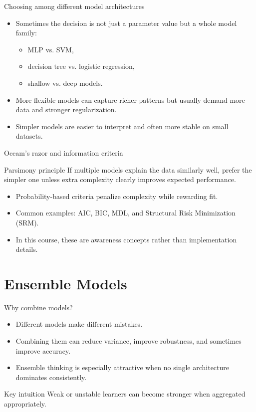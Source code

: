 \documentclass[12pt]{beamer}
\begin{document}
\begin{frame}{Choosing among different model architectures}
  \begin{itemize}
    \item Sometimes the decision is not just a parameter value but a whole model family:
      \begin{itemize}
        \item MLP vs. SVM,
        \item decision tree vs. logistic regression,
        \item shallow vs. deep models.
      \end{itemize}
    \item More flexible models can capture richer patterns but usually demand more data and stronger regularization.
    \item Simpler models are easier to interpret and often more stable on small datasets.
  \end{itemize}
\end{frame}

\begin{frame}{Occam's razor and information criteria}
  \begin{conceptbox}{Parsimony principle}
    If multiple models explain the data similarly well, prefer the simpler one unless extra complexity
    clearly improves expected performance.
  \end{conceptbox}
  \begin{itemize}
    \item Probability-based criteria penalize complexity while rewarding fit.
    \item Common examples: AIC, BIC, MDL, and Structural Risk Minimization (SRM).
    \item In this course, these are awareness concepts rather than implementation details.
  \end{itemize}
\end{frame}

\section{Ensemble Models}

\begin{frame}{Why combine models?}
  \begin{itemize}
    \item Different models make different mistakes.
    \item Combining them can reduce variance, improve robustness, and sometimes improve accuracy.
    \item Ensemble thinking is especially attractive when no single architecture dominates consistently.
  \end{itemize}
  \begin{conceptbox}{Key intuition}
    Weak or unstable learners can become stronger when aggregated appropriately.
  \end{conceptbox}
\end{frame}
\end{document}
